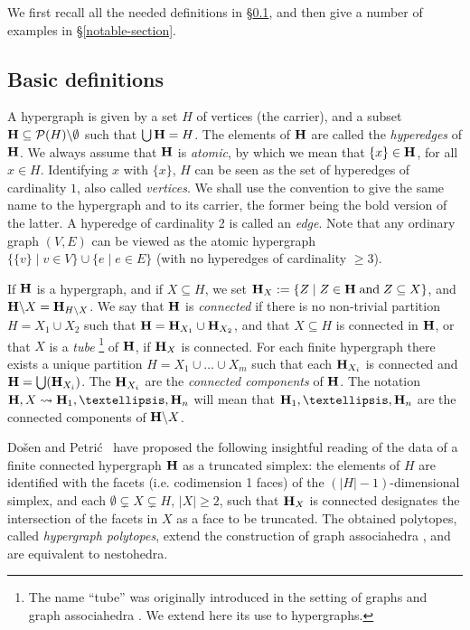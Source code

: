 \documentclass[11pt]{article}
\theoremstyle{definition}
\numberwithin{equation}{section}
\numberwithin{equation}{section}
\newcommand{\inc}{\subseteq}
\newcommand{\set}[1]{\{#1\}}
\newcommand{\setc}[2]{\set{#1 \mid #2}}
\newcommand{\union}{\cup}		%
\newcommand{\Union}{\bigcup}		%
\newcommand{\restrH}[2]{\hyper{#1}\backslash #2}
\newcommand{\hyper}[1]{{\bf #1}}
\newcommand{\incs}{\subsetneq}
\begin{document}
We first recall all the needed definitions in \S\ref{basic-definitions-section}, and then give a number of examples in \S\ref{notable-section}.

\subsection{Basic definitions} \label{basic-definitions-section}
A hypergraph is given by a set  $H$ of vertices (the carrier), and a subset 
$\hyper{H}\inc {\mathcal{P}}(H)\backslash\emptyset$ such that $\Union \hyper{H}=H$.
 The elements of $\hyper{H}$ are called the {\em hyperedges} of $\hyper{H}$.  
 We always assume that $\hyper{H}$ is {\em atomic}, by which we mean that 
 $\set{x}\in \hyper{H}$, for all $x\in H$. 
 Identifying $x$ with $\set{x}$, $H$ can be seen as the set of  hyperedges of 
 cardinality $1$, also called {\em vertices}. We shall use the convention to 
 give the same name to the hypergraph and to its carrier, the former being 
 the bold version of the latter. 
A hyperedge of cardinality 2 is called an {\em edge}.  Note that any ordinary graph $(V,E)$ can be viewed as the atomic hypergraph
$\setc{\set{v}}{v\in V} \union \setc{e}{e\in E}$ (with no hyperedges of cardinality $\geq 3$). 

If $\hyper{H}$ is a hypergraph,  and if  $X\inc H$, we set
$\hyper{H}_X:=\setc{Z}{Z\in \hyper{H}\;\mbox{and}\; Z\inc X}$, and $\restrH{H}{X}=\hyper{H}_{H\backslash X}$.
We say that $\hyper{H}$ is {\em connected} if there is no non-trivial partition $H=X_1\union X_2$ such that $\hyper{H}=\hyper{H}_{X_1}\union \hyper{H}_{X_2}$, and that $X\inc H$ is connected in $\hyper{H}$, or that $X$ is a {\em tube} \footnote{The name ``tube'' was originally introduced in the setting of graphs and graph associahedra \cite{CD-CCGA}. We extend here its use to hypergraphs.}
of  $\hyper{H}$, if $\hyper{H}_X$ is connected.
For each finite hypergraph there exists a unique partition
$H=X_1\union\ldots\union X_m$ such that each $\hyper{H}_{X_i}$ is connected and $\hyper{H}=\Union(\hyper{H}_{X_i})$.  The $\hyper{H}_{X_i}$ are  the {\em connected components} of $\hyper{H}$. The notation
$\hyper{H},X  \leadsto \hyper{H}_1,\ldots, \hyper{H}_n$
 will mean that  $\hyper{H}_1,\ldots,\hyper{H}_n$ are  the
 connected components of $\restrH{H}{X}$.  

Do\v sen and Petri\'c~\cite{DP} have proposed the following insightful reading of the data of a finite connected hypergraph $\hyper{H}$ as a truncated simplex: the elements of $H$ are identified with the facets (i.e. codimension 1 faces) of the $(|H|-1)$-dimensional simplex, and each $\emptyset\incs X\incs H$, $|X|\geq 2$, such that    $\hyper{H}_X$ is connected designates the intersection of the facets in $X$ as a face to be truncated. The obtained polytopes, called \emph{hypergraph polytopes}, extend the construction of graph associahedra \cite{CD-CCGA, Zel06}, and are equivalent to nestohedra.
\end{document}
